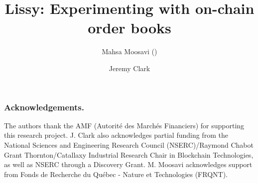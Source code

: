 \documentclass[envcountsect]{llncs}
\begin{document}
\frontmatter
\mainmatter

\title{\Large \bf Lissy: Experimenting with on-chain order books}



\author{Mahsa Moosavi (\Letter) \and Jeremy Clark}



\maketitle











\subsubsection*{Acknowledgements.}  The authors thank the AMF (Autorité des Marchés Financiers) for supporting this research project. J. Clark also acknowledges partial funding from the National Sciences and Engineering Research Council (NSERC)/Raymond Chabot Grant Thornton/Catallaxy Industrial Research Chair in Blockchain Technologies, as well as NSERC through a Discovery Grant. M. Moosavi acknowledges support from Fonds de Recherche du Québec - Nature et Technologies (FRQNT).








%
\end{document}
